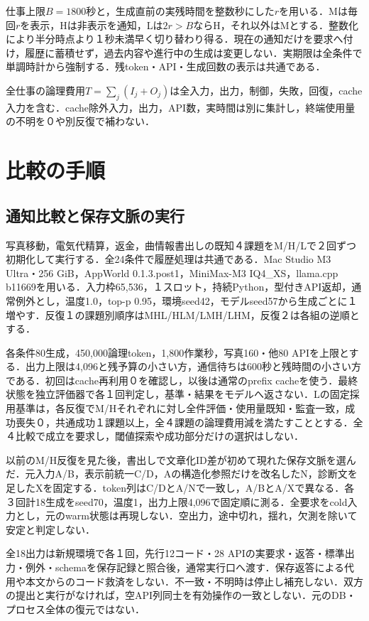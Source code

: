 \documentclass[letter]{ieicej}
\begin{document}
仕事上限$B=1800$秒と，生成直前の実残時間を整数秒にした$r$を用いる．Mは毎回$r$を表示，Hは非表示を通知，Lは$2r>B$ならH，それ以外はMとする．整数化により半分時点より１秒未満早く切り替わり得る．現在の通知だけを要求へ付け，履歴に蓄積せず，過去内容や進行中の生成は変更しない．実期限は全条件で単調時計から強制する．残token・API・生成回数の表示は共通である．

全仕事の論理費用$T=\sum_j(I_j+O_j)$は全入力，出力，制御，失敗，回復，cache入力を含む．cache除外入力，出力，API数，実時間は別に集計し，終端使用量の不明を０や別反復で補わない．

\section{比較の手順}
\subsection{通知比較と保存文脈の実行}
写真移動，電気代精算，返金，曲情報書出しの既知４課題をM/H/Lで２回ずつ初期化して実行する．全24条件で履歴処理は共通である．Mac Studio M3 Ultra・256 GiB，AppWorld 0.1.3.post1，MiniMax-M3 IQ4\_XS，llama.cpp b11669を用いる．入力枠65,536，１スロット，持続Python，型付きAPI返却，通常例外とし，温度1.0，top-p 0.95，環境seed42，モデルseed57から生成ごとに１増やす．反復１の課題別順序はMHL/HLM/LMH/LHM，反復２は各組の逆順とする．

各条件80生成，450,000論理token，1,800作業秒，写真160・他80 APIを上限とする．出力上限は4,096と残予算の小さい方，通信待ちは600秒と残時間の小さい方である．初回はcache再利用０を確認し，以後は通常のprefix cacheを使う．最終状態を独立評価器で各１回判定し，基準・結果をモデルへ返さない．Lの固定採用基準は，各反復でM/Hそれぞれに対し全件評価・使用量既知・監査一致，成功喪失０，共通成功１課題以上，全４課題の論理費用減を満たすこととする．全４比較で成立を要求し，閾値探索や成功部分だけの選択はしない．

以前のM/H反復を見た後，書出しで文章化ID差が初めて現れた保存文脈を選んだ．元入力A/B，表示前統一C/D，Aの構造化参照だけを改名したN，診断文を足したXを固定する．token列はC/DとA/Nで一致し，A/BとA/Xで異なる．各３回計18生成をseed70，温度1，出力上限4,096で固定順に測る．全要求をcold入力とし，元のwarm状態は再現しない．空出力，途中切れ，揺れ，欠測を除いて安定と判定しない．

全18出力は新規環境で各１回，先行12コード・28 APIの実要求・返答・標準出力・例外・schemaを保存記録と照合後，通常実行口へ渡す．保存返答による代用や本文からのコード救済をしない．不一致・不明時は停止し補充しない．双方の提出と実行がなければ，空API列同士を有効操作の一致としない．元のDB・プロセス全体の復元ではない．
\end{document}
